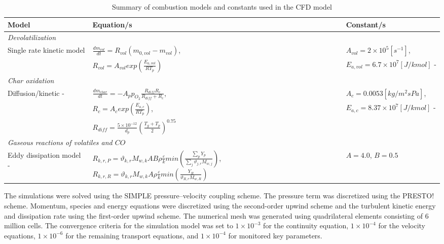 \documentclass[a4paper,fleqn]{cas-sc}
\begin{document}
\begin{table}[h!]
\caption{Summary of combustion models and constants used in the CFD model}\label{tbl_combust}
\begin{tabular*}{\tblwidth}{p{}p{}p{}}
\toprule
Model & Equation/s & Constant/s\\
\midrule
\multicolumn{3}{l}{\textit{Devolatilization}} \\ %
Single rate kinetic model &$\frac{dm_{vol}}{dt} = R_{vol}(m_{0,vol}-m_{vol})$,  & $A_{vol} = 2\times10^5 [s^{-1}]$, \\
& $R_{vol} = A_{vol}exp\left(\frac{E_{a,vol}}{RT_p}\right)$ & $ E_{a,vol} = 6.7\times10^7 [J/kmol]$ - \cite{Sheng2004} \\
\multicolumn{3}{l}{\textit{Char oxidation}} \\
Diffusion/kinetic - \citep{Baum1971} & $\frac{dm_{char}}{dt} = -A_p p_{O_{2}} \frac{R_{diff}R_c}{R_{diff} + R_c}$,  & $A_{c} = 0.0053 [kg/m^2sPa]$, \\
& $R_{c} = A_{c}exp\left(\frac{E_{a,c}}{RT_p}\right)$,  & $E_{a,c} = 8.37\times10^7 [J/kmol]$ - \cite{Sheng2004} \\
& $R_{diff} = \frac{5\times10^{-12}}{d_p} \left(\frac{T_g+T_p}{2}\right)^{0.75}$&\\
\multicolumn{3}{l}{\textit{Gaseous reactions of volatiles and $CO$}} \\
Eddy dissipation model - \cite{Ansys} & $R_{k,r,P} =\vartheta_{k,r}M_{w,k}AB\rho\frac{\varepsilon}{k}min\left(\frac{\sum_{p} Y_p}{\sum_{j}\vartheta_{j,r}M_{w,j}}\right)$, $R_{k,r,R} =\vartheta_{k,r}M_{w,k}A\rho\frac{\varepsilon}{k}min\left(\frac{Y_R}{\vartheta_{R,r}M_{w,R}}\right)$ & $A=4.0$, $B=0.5$\\
\bottomrule
\end{tabular*}
\end{table}

The simulations were solved using the SIMPLE pressure–velocity coupling scheme. The pressure term was discretized using the PRESTO! scheme. Momentum, species and energy equations were discretized using the second-order upwind scheme and the turbulent kinetic energy and dissipation rate using the first-order upwind scheme. The numerical mesh was generated using quadrilateral elements consisting of 6 million cells.  The convergence criteria for the simulation model was set to $1\times10^{-3}$ for the continuity equation, $1\times10^{-4}$ for the velocity equations, $1\times10^{-6}$ for the remaining transport equations, and $1\times10^{-4}$ for monitored key parameters.
\end{document}
